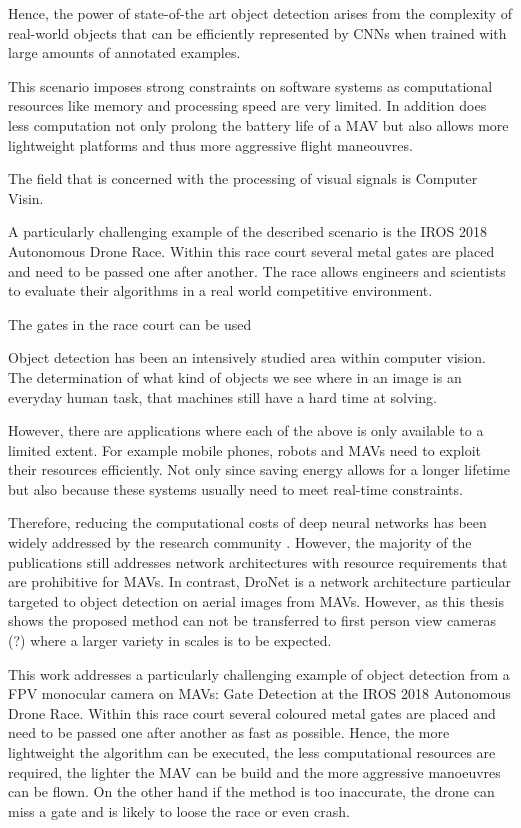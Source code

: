 Hence, the power of state-of-the art object detection arises from the complexity of real-world objects that can be efficiently represented by \acp{CNN} when trained with large amounts of annotated examples.


This scenario imposes strong constraints on software systems as computational resources like memory and processing speed are very limited. In addition does less computation not only prolong the battery life of a \ac{MAV} but also allows more lightweight platforms and thus more aggressive flight maneouvres.

The field that is concerned with the processing of visual signals is Computer Visin.

A particularly challenging example of the described scenario is the \ac{IROS} 2018 Autonomous Drone Race. Within this race court several metal gates are placed and need to be passed one after another. The race allows engineers and scientists to evaluate their algorithms in a real world competitive environment.

The gates in the race court can be used

Object detection has been an intensively studied area within computer vision. The determination of what kind of objects we see where in an image is an everyday human task, that machines still have a hard time at solving.



However, there are applications where each of the above is only available to a limited extent. For example mobile phones, robots and \acp{MAV} need to exploit their resources efficiently. Not only since saving energy allows for a longer lifetime but also because these systems usually need to meet real-time constraints.

Therefore, reducing the computational costs of deep neural networks has been widely addressed by the research community . However, the majority of the publications still addresses network architectures with resource requirements that are prohibitive for \acp{MAV}. In contrast, DroNet \cite{Kyrkou2018} is a network architecture particular targeted to object detection on aerial images from \acp{MAV}. However, as this thesis shows the proposed method can not be transferred to first person view cameras (?) where a larger variety in scales is to be expected.

This work addresses a particularly challenging example of object detection from a FPV monocular camera on \acp{MAV}: Gate Detection at the IROS 2018 Autonomous Drone Race. Within this race court several coloured metal gates are placed and need to be passed one after another as fast as possible. Hence, the more lightweight the algorithm can be executed, the less computational resources are required, the lighter the \ac{MAV} can be build and the more aggressive manoeuvres can be flown. On the other hand if the method is too inaccurate, the drone can miss a gate and is likely to loose the race or even crash.


